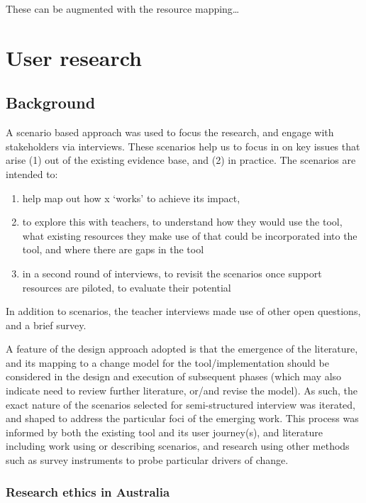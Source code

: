 \documentclass[
]{book}
\providecommand{\tightlist}{%
  \setlength{\itemsep}{0pt}\setlength{\parskip}{0pt}}
\begin{document}
These can be augmented with the resource mapping\ldots{}

\hypertarget{users}{%
\chapter{User research}\label{users}}

\hypertarget{background-2}{%
\section{Background}\label{background-2}}

A scenario based approach was used to focus the research, and engage with stakeholders via interviews. These scenarios help us to focus in on key issues that arise (1) out of the existing evidence base, and (2) in practice. The scenarios are intended to:

\begin{enumerate}
\def\labelenumi{\arabic{enumi}.}
\tightlist
\item
  help map out how x `works' to achieve its impact,
\item
  to explore this with teachers, to understand how they would use the tool, what existing resources they make use of that could be incorporated into the tool, and where there are gaps in the tool
\item
  in a second round of interviews, to revisit the scenarios once support resources are piloted, to evaluate their potential
\end{enumerate}

In addition to scenarios, the teacher interviews made use of other open questions, and a brief survey.

A feature of the design approach adopted is that the emergence of the literature, and its mapping to a change model for the tool/implementation should be considered in the design and execution of subsequent phases (which may also indicate need to review further literature, or/and revise the model). As such, the exact nature of the scenarios selected for semi-structured interview was iterated, and shaped to address the particular foci of the emerging work. This process was informed by both the existing tool and its user journey(s), and literature including work using or describing scenarios, and research using other methods such as survey instruments to probe particular drivers of change.

\hypertarget{research-ethics-in-australia}{%
\subsection{Research ethics in Australia}\label{research-ethics-in-australia}}
\end{document}
